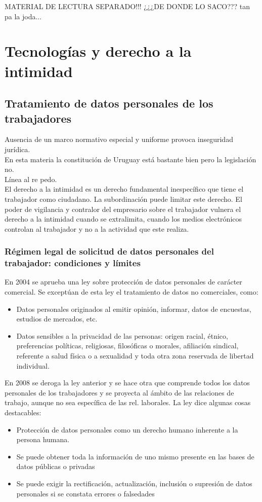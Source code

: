 \documentclass[spanish,12pt,a4paper,titlepage]{report}
\begin{document}
MATERIAL DE LECTURA SEPARADO!!! ¿¿¿DE DONDE LO SACO??? tan pa la joda...

\section{Tecnologías y derecho a la intimidad}
\subsection{Tratamiento de datos personales de los trabajadores}
Ausencia de un marco normativo especial y uniforme provoca inseguridad jurídica.\\

En esta materia la constitución de Uruguay está bastante bien pero la legislación no.\\

Línea al re pedo.\\

El derecho a la intimidad es un derecho fundamental inespecífico que tiene el trabajador como ciudadano. La subordinación puede limitar este derecho. El poder de vigilancia y contralor del empresario sobre el trabajador vulnera el derecho a la intimidad cuando se extralimita, cuando los medios electrónicos controlan al trabajador y no a la actividad que este realiza.\\

\subsubsection{Régimen legal de solicitud de datos personales del trabajador: condiciones y límites}
En 2004 se aprueba una ley sobre protección de datos personales de carácter comercial. Se exceptúan de esta ley el tratamiento de datos no comerciales, como:
\begin{itemize}
	\item Datos personales originados al emitir opinión, informar, datos de encuestas, estudios de mercados, etc.
	\item Datos sensibles a la privacidad de las personas: origen racial, étnico, preferencias políticas, religiosas, filosóficas o morales, afiliación sindical, referente a salud física o a sexualidad y toda otra zona reservada de libertad individual.
\end{itemize}
En 2008 se deroga la ley anterior y se hace otra que comprende  todos los datos personales de los trabajadores y se proyecta al ámbito de las relaciones de trabajo, aunque no sea específica de las rel. laborales.
La ley dice algunas cosas destacables:
\begin{itemize}
	\item Protección de datos personales como un derecho humano inherente a la persona humana.
	\item Se puede obtener toda la información de uno mismo presente en las bases de datos públicas o privadas
	\item Se puede exigir la rectificación, actualización, inclusión o supresión de datos personales si se constata errores o falsedades
\end{itemize}
\end{document}
